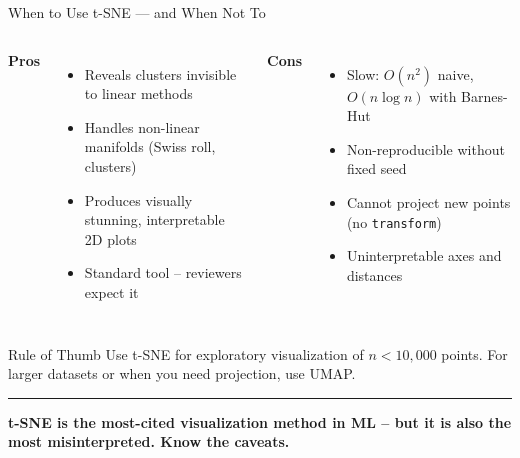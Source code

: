 \documentclass[8pt,aspectratio=169]{beamer}
\newcommand{\bottomnote}[1]{%
\vfill
\vspace{-2mm}
\textcolor{mllavender2}{\rule{\textwidth}{0.4pt}}
\vspace{1mm}
\footnotesize
\textbf{#1}
}
\newenvironment{compactlist}{%
  \begin{itemize}%
    \setlength{\itemsep}{2pt}%
    \setlength{\parskip}{0pt}%
    \setlength{\parsep}{0pt}%
}{%
  \end{itemize}%
}
\begin{document}
\begin{frame}[t]{When to Use t-SNE --- and When Not To}
\begin{columns}[T]
\small
\textbf{\textcolor{mlgreen}{Pros}}
\begin{compactlist}
\item Reveals clusters invisible to linear methods
\item Handles non-linear manifolds (Swiss roll, clusters)
\item Produces visually stunning, interpretable 2D plots
\item Standard tool -- reviewers expect it
\end{compactlist}

\small
\textbf{\textcolor{mlred}{Cons}}
\begin{compactlist}
\item Slow: $O(n^2)$ naive, $O(n \log n)$ with Barnes-Hut
\item Non-reproducible without fixed seed
\item Cannot project new points (no \texttt{transform})
\item Uninterpretable axes and distances
\end{compactlist}
\end{columns}

\vspace{3mm}
\begin{block}{Rule of Thumb}
\scriptsize Use t-SNE for exploratory visualization of $n < 10{,}000$ points. For larger datasets or when you need projection, use UMAP.
\end{block}

\bottomnote{t-SNE is the most-cited visualization method in ML -- but it is also the most misinterpreted. Know the caveats.}
\end{frame}
\end{document}
